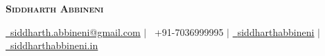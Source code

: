 \documentclass[12pt]{article}
\makeatletter
\newcommand{\MyName}{Siddharth Abbineni}
\newcommand{\MyEmail}{siddharth.abbineni@gmail.com}
\newcommand{\MyPhone}{+91-7036999995}
\newcommand{\MyLinkedIn}{siddharthabbineni}
\newcommand{\MyWebsite}{siddharthabbineni.in}
\makeatother
\begin{document}
\setlength{\footskip}{4.35004pt}


\begin{center}
    \textbf{\Huge \scshape {\MyName}} \\ \vspace{3pt} 

    {\small %
    \href{mailto:siddharth.abbineni@gmail.com}{\faEnvelope~\underline{{\MyEmail}}} $|$ 
    {\faPhone~{\MyPhone}} $|$ 
    \href{https://www.linkedin.com/in/siddharthabbineni/}{\faLinkedin~\underline{{\MyLinkedIn}}} $|$
    \href{https://www.siddharthabbineni.in/}{\faGlobe~\underline{{\MyWebsite}}}
    } %
\end{center}

\vspace{-15pt}




    
            
              
\end{document}
